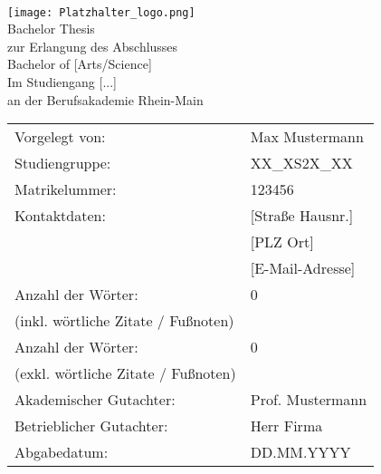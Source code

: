 \begin{center}
     \\[3ex]
    \texttt{[image: Platzhalter\_logo.png]} \\[3ex]
    \large{Bachelor Thesis\\ [-10pt]
        zur Erlangung des Abschlusses\\ [-10pt]
        Bachelor of [Arts/Science]\\
        Im Studiengang [...]\\ [-10pt]
        an der Berufsakademie Rhein-Main
}
\end{center}

\renewcommand{\arraystretch}{2.5}
\begin{table}[h]
    \setlength{\tabcolsep}{32pt}
    \begin{tabularx}{\textwidth}{l l}
        Vorgelegt von:                      & Max Mustermann   \\ [-15pt]
        Studiengruppe:                      & XX\_XS2X\_XX     \\ [-15pt]
        Matrikelummer:                      & 123456           \\ [-15pt]
        Kontaktdaten:                       & [Straße Hausnr.] \\ [-15pt]
        ~                                   & [PLZ Ort]        \\ [-15pt]
        ~                                   & [E-Mail-Adresse] \\
        Anzahl der Wörter:                  & 0                \\ [-18pt]
        (inkl. wörtliche Zitate / Fußnoten) & ~                \\
        Anzahl der Wörter:                  & 0                \\ [-18pt]
        (exkl. wörtliche Zitate / Fußnoten) & ~                \\
        Akademischer Gutachter:             & Prof. Mustermann \\ [-15pt]
        Betrieblicher Gutachter:            & Herr Firma       \\
        Abgabedatum:                        & DD.MM.YYYY       \\
    \end{tabularx}
\end{table}